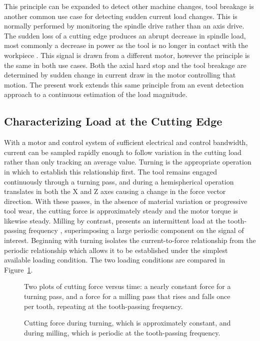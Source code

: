 This principle can be expanded to detect other machine changes, tool breakage is another common use case for detecting sudden current load changes. This is normally performed by monitoring the spindle drive rather than an axis drive. The sudden loss of a cutting edge produces an abrupt decrease in spindle load, most commonly a decrease in power as the tool is no longer in contact with the workpiece \cite{cho_tool_2016,wong_technical_2020}. This signal is drawn from a different motor, however the principle is the same in both use cases. Both the axial hard stop and the tool breakage are determined by sudden change in current draw in the motor controlling that motion. The present work extends this same principle from an event detection approach to a continuous estimation of the load magnitude. 

\subsection{Characterizing Load at the Cutting Edge}\label{characterizingLoad}
With a motor and control system of sufficient electrical and control bandwidth, current can be sampled rapidly enough to follow variation in the cutting load rather than only tracking an average value. Turning is the appropriate operation in which to establish this relationship first. The tool remains engaged continuously through a turning pass, and during a hemispherical operation translates in both the X and Z axes causing a change in the force vector direction. With these passes, in the absence of material variation or progressive tool wear, the cutting force is approximately steady and the motor torque is likewise steady. Milling by contrast, presents an intermittent load at the tooth-passing frequency \cite{altintas_manufacturing_2012}, superimposing a large periodic component on the signal of interest. Beginning with turning isolates the current-to-force relationship from the periodic relationship which allows it to be established under the simplest available loading condition. The two loading conditions are compared in Figure~\ref{fig:turning_vs_milling}.

\begin{figure}[htbp]
	\centering
		{Two plots of cutting force versus time: a nearly constant force for a turning pass, and a force for a milling pass that rises and falls once per tooth, repeating at the tooth-passing frequency.}
	\caption[Cutting force in turning and milling]{Cutting force during turning, which is approximately constant, and during milling, which is periodic at the tooth-passing frequency.}
	\label{fig:turning_vs_milling}
\end{figure}

